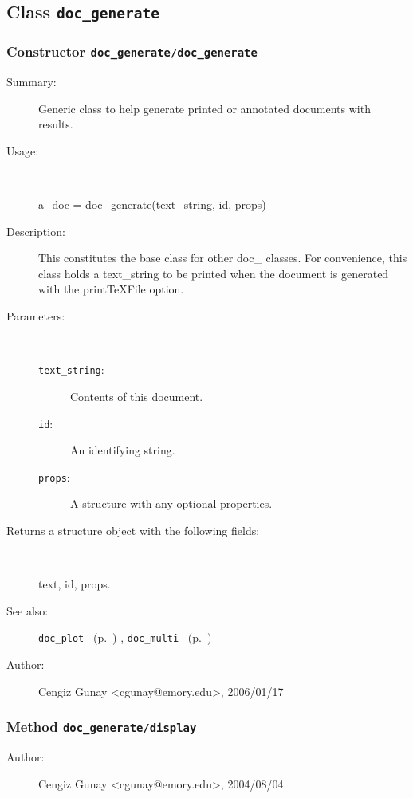 \subsection{Class \texttt{doc\_generate}}%
%
\label{ref_doc_generate}%
\hypertarget{ref_doc_generate}{}%
\subsubsection[Constructor \texttt{doc\_generate}]{Constructor \texttt{doc\_generate/doc\_generate}}%
%
\label{ref_doc_generate__doc_generate}%
\hypertarget{ref_doc_generate__doc_generate}{}%
\begin{description}
\item[Summary:]Generic class to help generate printed or annotated documents with results.
%
\item[Usage:]~%
\begin{lyxcode}%
a\_doc = doc\_generate(text\_string, id, props)
%
\end{lyxcode}%
%
\item[Description:]%
This constitutes the base class for other doc\_ classes. For convenience,
 this class holds a text\_string to be printed when the document is generated
 with the printTeXFile option.
\item[Parameters:]~
\begin{description}%
\item[\texttt{text\_string}:]
 Contents of this document.
\item[\texttt{id}:]
 An identifying string.
\item[\texttt{props}:]
 A structure with any optional properties.
\end{description}%
%
\item[Returns a structure object with the following fields:]~

	text, id, props.
%
%
\item[See also:]%
\hyperlink{ref_doc_plot}{\texttt{doc\_plot}}%
\ (p.~\pageref{ref_doc_plot})%
%
, \hyperlink{ref_doc_multi}{\texttt{doc\_multi}}%
\ (p.~\pageref{ref_doc_multi})%
%
%
\item[Author:]%
Cengiz Gunay <cgunay@emory.edu>, 2006/01/17%
\end{description}
\methodline%
\subsubsection[Method \texttt{display}]{Method \texttt{doc\_generate/display}}%
%
\label{ref_doc_generate__display}%
\hypertarget{ref_doc_generate__display}{}%
\begin{description}
%
%
%
%
%
%
%
\item[Author:]%
Cengiz Gunay <cgunay@emory.edu>, 2004/08/04%
\end{description}
\methodline%
